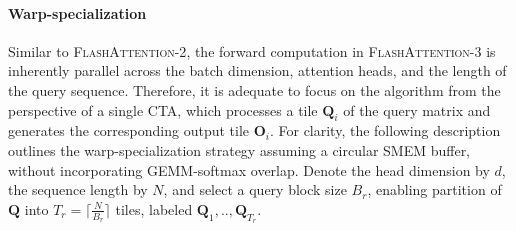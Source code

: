 \paragraph{Warp-specialization}
Similar to \textsc{FlashAttention-2}, the forward computation in \textsc{FlashAttention-3} is inherently parallel across the batch dimension, attention heads, and the length of the query sequence. Therefore, it is adequate to focus on the algorithm from the perspective of a single CTA, which processes a tile $\mathbf{Q}_i$ of the query matrix and generates the corresponding output tile $\mathbf{O}_i$. For clarity, the following description outlines the warp-specialization strategy assuming a circular SMEM buffer, without incorporating GEMM-softmax overlap. Denote the head dimension by $d$, the sequence length by $N$, and select a query block size $B_r$, enabling partition of $\mathbf{Q}$ into $T_r = \lceil \frac{N}{B_r} \rceil$ tiles, labeled $\mathbf{Q}_1, .., \mathbf{Q}_{T_r}$.

